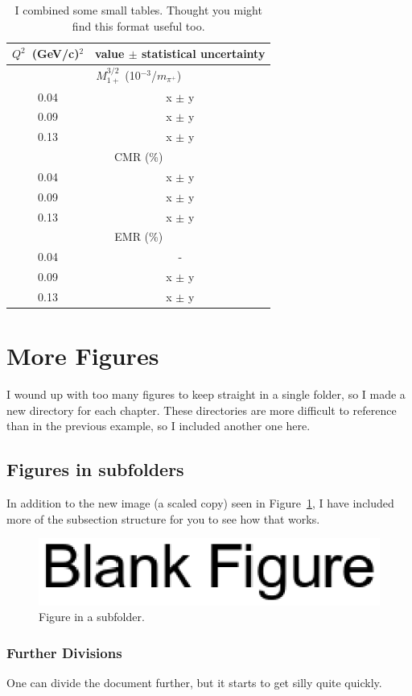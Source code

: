 \begin {table}[!htbp]
\caption {I combined some small tables.  Thought you might find this format useful too.} 
\centering
\begin{tabular}{|c| c|}
\hline
 $Q^2$~(GeV/c)$^2$	& value $\pm$ statistical uncertainty \\
\hline
\multicolumn{2}{|c|}{$M^{3/2}_{1+}$ (10$^{-3}$/$m_{\pi^+}$) }\\
\hline
0.04	& x	$\pm$ y	   \\ \hline
0.09	& x	$\pm$ y	    \\ \hline
0.13	& x	$\pm$ y	    \\
\hline
\multicolumn{2}{|c|}{CMR (\%)}\\
\hline
0.04		&	x	$\pm$ y      \\ \hline
0.09		&	x	$\pm$ y       \\ \hline
0.13		&	x	$\pm$ y       \\
\hline
\multicolumn{2}{|c|}{EMR (\%)}\\
\hline
0.04	   & -   \\ \hline
0.09	   & x	$\pm$ y    \\ \hline
0.13	   & x	$\pm$ y    \\ \hline
\end{tabular}
\label{tab:ex_combo} 
\end{table}






\section{More Figures}

I wound up with too many figures to keep straight in a single folder, so I made a new
directory for each chapter.  These directories are more difficult to reference than in the 
previous example, so I included another one here.



\subsection{Figures in subfolders}

In addition to the new image (a scaled copy) seen in Figure~\ref{fig:test2}, I have included more of
the subsection structure for you to see how that works.

\begin{figure}[!htbp]
\center
\includegraphics[width = 0.5\columnwidth]{tex/2-results-images/blank.eps}
\caption{Figure in a subfolder.} 
\label{fig:test2}
\end{figure}


\subsubsection{Further Divisions}

One can divide the document further, but it starts to get silly quite quickly.